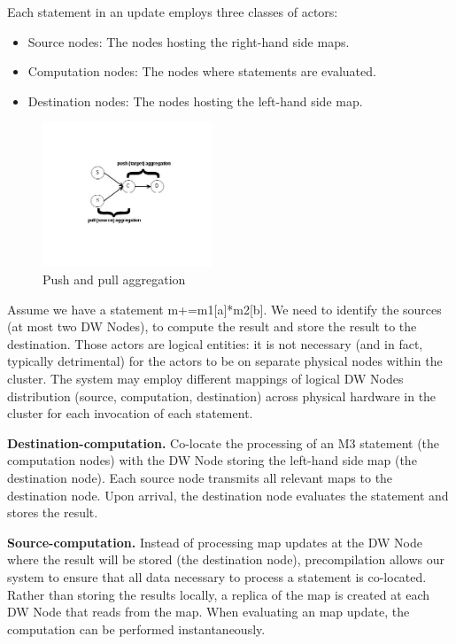 \documentclass{sig-semester}
\def\M3{M3\xspace}
\begin{document}
Each statement in an update employs three classes of actors:
\begin{itemize}
 \item Source nodes: The nodes hosting the right-hand side maps.
 \item Computation nodes: The nodes where statements are evaluated.
 \item Destination nodes: The nodes hosting the left-hand side map.
\end{itemize}

\begin{figure}[!b]
\begin{center}
\includegraphics[width=2in]{pushPull.jpg}
\vspace{-3mm}
\caption{Push and pull aggregation}
\label{fig:pushPull}
\vspace{-2mm}
\end{center}
\end{figure}

Assume we have a statement m+=m1[a]*m2[b]. We need to identify the sources (at most two DW Nodes), to compute the result and store the result to the destination. Those actors are logical entities: it is not necessary (and in fact, typically detrimental) for the actors to be on separate physical nodes within the cluster. The system may employ different mappings of logical DW Nodes distribution (source, computation, destination) across physical hardware in the cluster for each invocation of each statement.

\textbf{Destination-computation.}
Co-locate the processing of an \M3 statement (the computation nodes) with the DW Node storing the left-hand side map (the destination node). Each source node transmits all relevant maps to the destination node. Upon arrival, the destination node evaluates the statement and stores the result.

\textbf{Source-computation.} Instead of processing map updates at the DW Node where the result will be stored (the destination node), precompilation allows our system to ensure that all data necessary to process a statement is co-located. Rather than storing the results locally, a replica of the map is created at each DW Node that reads from the map. When evaluating an map update, the computation can be performed instantaneously.
\end{document}
